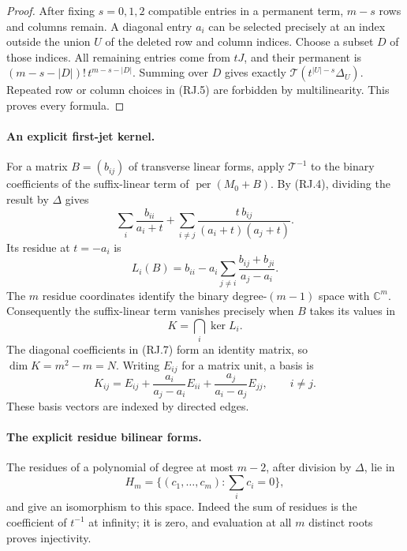 \begin{proof}
After fixing \(s=0,1,2\) compatible entries in a permanent
term, \(m-s\) rows and columns remain. A diagonal entry
\(a_i\) can be selected precisely at an index outside
the union \(U\) of the deleted row and column indices.
Choose a subset \(D\) of those indices.
All remaining entries come from \(tJ\), and their
permanent is \((m-s-|D|)!\,t^{m-s-|D|}\).
Summing over \(D\) gives exactly
\(\mathcal T(t^{|U|-s}\Delta_U)\).
Repeated row or column choices in (RJ.5) are forbidden
by multilinearity. This proves every formula.
\end{proof}

\paragraph{An explicit first-jet kernel.}
For a matrix \(B=(b_{ij})\) of transverse linear forms,
apply \(\mathcal T^{-1}\) to the binary coefficients
of the suffix-linear term of \(\operatorname{per}(M_0+B)\).
By (RJ.4), dividing the result by \(\Delta\) gives
\[
           \sum_i\frac{b_{ii}}{a_i+t}
              +\sum_{i\ne j}
                   \frac{t\,b_{ij}}{(a_i+t)(a_j+t)}.
                                                               \tag{RJ.6}
\]
Its residue at \(t=-a_i\) is
\[
       L_i(B)=b_{ii}
                 -a_i\sum_{j\ne i}\frac{b_{ij}+b_{ji}}{a_j-a_i}.
                                                               \tag{RJ.7}
\]
The \(m\) residue coordinates identify the binary
degree-\((m-1)\) space with \(\mathbb C^m\).
Consequently the suffix-linear term vanishes precisely
when \(B\) takes its values in
\[
                         K=\bigcap_i\ker L_i.
                                                               \tag{RJ.8}
\]
The diagonal coefficients in (RJ.7) form an identity
matrix, so \(\dim K=m^2-m=N\).
Writing \(E_{ij}\) for a matrix unit, a basis is
\[
 K_{ij}=E_{ij}
       +\frac{a_i}{a_j-a_i}E_{ii}
       +\frac{a_j}{a_i-a_j}E_{jj},
                         \qquad i\ne j.
                                                               \tag{RJ.9}
\]
These basis vectors are indexed by directed edges.

\paragraph{The explicit residue bilinear forms.}
The residues of a polynomial of degree at most \(m-2\),
after division by \(\Delta\), lie in
\[
                H_m=\{(c_1,\ldots,c_m):\sum_i c_i=0\},
                                                               \tag{RJ.10}
\]
and give an isomorphism to this space. Indeed the sum
of residues is the coefficient of \(t^{-1}\) at infinity;
it is zero, and evaluation at all \(m\) distinct roots
proves injectivity.

